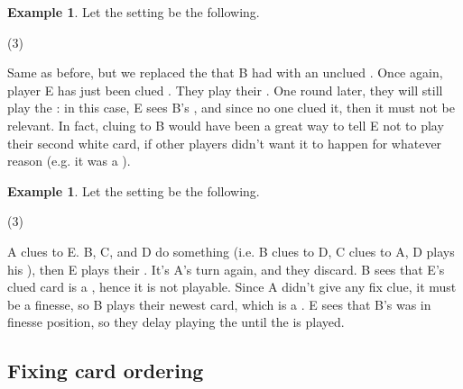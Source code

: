 \documentclass[a4paper]{article}
\theoremstyle{plain}
\theoremstyle{definition}
\newtheorem{example}[theorem]{Example}
\begin{document}
\begin{example}
	
	Let the setting be the following.
	
	\begin{tasks}(3)
		\task[+]      
		\task[A]    
		\task[B]    
		\task[C]    
		\task[D]    
		\task[E]    
	\end{tasks}
	
	Same as before, but we replaced the  that B had with an unclued . Once again, player E has just been clued . They play their . One round later, they will still play the : in this case, E sees B's , and since no one clued it, then it must not be relevant. In fact, cluing  to B would have been a great way to tell E not to play their second white card, if other players didn't want it to happen for whatever reason (e.g. it was a ).
	
\end{example}

\begin{example}
	
	Let the setting be the following.
	
	\begin{tasks}(3)
		\task[+]      
		\task[A]    
		\task[B]    
		\task[C]    
		\task[D]    
		\task[E]    
	\end{tasks}
	
	A clues  to E. B, C, and D do something (i.e. B clues  to D, C clues  to A, D plays his ), then E plays their . It's A's turn again, and they discard. B sees that E's clued card is a , hence it is not playable. Since A didn't give any fix clue, it must be a finesse, so B plays their newest card, which is a . E sees that B's  was in finesse position, so they delay playing the  until the  is played.
	
\end{example}

\subsection{Fixing card ordering}
\end{document}

